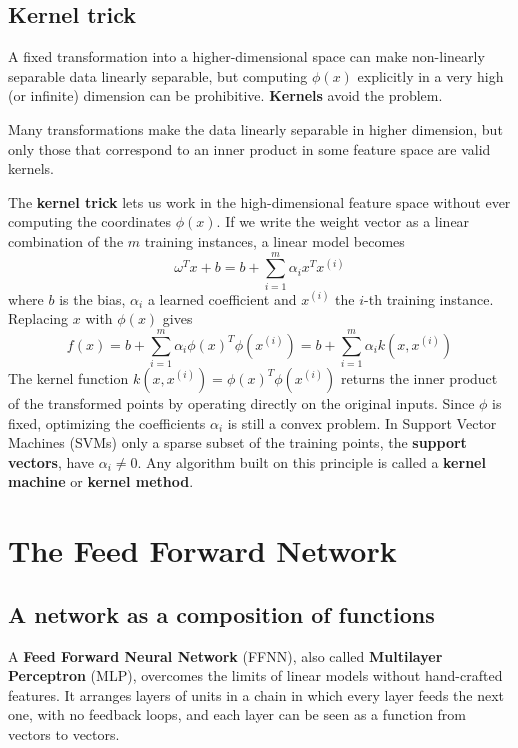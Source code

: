 \subsection{Kernel trick}
A fixed transformation into a higher-dimensional space can make non-linearly
separable data linearly separable, but computing $\phi(x)$ explicitly in a very
high (or infinite) dimension can be prohibitive. \textbf{Kernels} avoid the
problem.

\begin{note}
    Many transformations make the data linearly separable in higher dimension, but
    only those that correspond to an inner product in some feature space are valid
    kernels.
\end{note}

The \textbf{kernel trick} lets us work in the high-dimensional feature space
without ever computing the coordinates $\phi(x)$. If we write the weight vector as
a linear combination of the $m$ training instances, a linear model becomes
\begin{equation}
    \omega^T x + b = b + \sum_{i=1}^m \alpha_i x^T x^{(i)}
\end{equation}
where $b$ is the bias, $\alpha_i$ a learned coefficient and $x^{(i)}$ the $i$-th
training instance. Replacing $x$ with $\phi(x)$ gives
\begin{equation}
    f(x) = b + \sum_{i=1}^m \alpha_i \phi(x)^T \phi(x^{(i)}) = b + \sum_{i=1}^m \alpha_i k(x, x^{(i)})
\end{equation}
The kernel function $k(x, x^{(i)}) = \phi(x)^T \phi(x^{(i)})$ returns the inner
product of the transformed points by operating directly on the original inputs.
Since $\phi$ is fixed, optimizing the coefficients $\alpha_i$ is still a convex
problem. In Support Vector Machines (SVMs) only a sparse subset of the training
points, the \textbf{support vectors}, have $\alpha_i \neq 0$. Any algorithm built
on this principle is called a \textbf{kernel machine} or \textbf{kernel method}.

\section{The Feed Forward Network}
\label{sec:ffnn}
\subsection{A network as a composition of functions}
A \textbf{Feed Forward Neural Network} (FFNN), also called \textbf{Multilayer
Perceptron} (MLP), overcomes the limits of linear models without hand-crafted
features. It arranges layers of units in a chain in which every layer feeds the
next one, with no feedback loops, and each layer can be seen as a function from
vectors to vectors.

